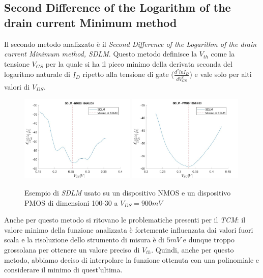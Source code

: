 \documentclass[12pt, letterpaper]{book}
\begin{document}
\subsection{Second Difference of the Logarithm of the drain current Minimum method}

Il secondo metodo analizzato è il \emph{Second Difference of the Logarithm of the drain current Minimum method, SDLM}. Questo metodo definisce la $V_{th}$ come la tensione $V_{GS}$ per la quale si ha il picco minimo della derivata seconda del logaritmo naturale di $I_D$ ripetto alla tensione di gate ($\frac{d^2lnI_D}{dV_{GS}^2}$) e vale solo per alti valori di $V_{DS}$. \\

\begin{figure}[h!]
\centering
 \includegraphics[width=0.49\textwidth]{SDLM-N4-100-30-NoFit}
 \includegraphics[width=0.49\textwidth]{SDLM-P1-100-30-NoFit}
 \caption{Esempio di \emph{SDLM} usato su un dispositivo NMOS e un dispositivo PMOS di dimensioni 100-30 a $V_{DS} = 900 mV$}
\end{figure}

Anche per questo metodo si ritovano le problematiche presenti per il \emph{TCM}: il valore minimo della funzione analizzata è fortemente influenzata dai valori fuori scala e la risoluzione dello strumento di misura è di $5 mV$ e dunque troppo grossolana per ottenere un valore preciso di $V_{th}$.
Quindi, anche per questo metodo, abbiamo deciso di interpolare la funzione ottenuta con una polinomiale e considerare il minimo di quest'ultima. \\
\end{document}
